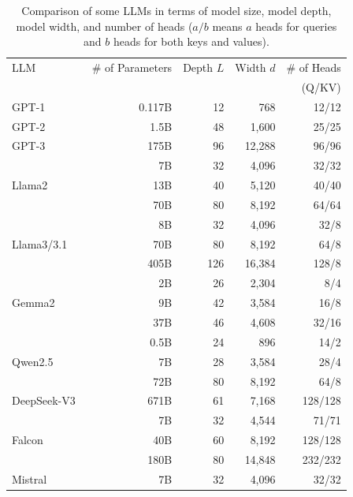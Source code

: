 \begin{table}[t]
\centering
\begingroup
\renewcommand{\arraystretch}{1.2}
\begin{tabular}{l | r | r | r | r }
LLM & \# of Parameters & Depth $L$ & Width $d$ & \# of Heads \\
    &                  &           &           &   (Q/KV)    \\ \hline
GPT-1~\cite{radford-etal:2018improving} & 0.117B & 12 & 768 & 12/12 \\
GPT-2~\cite{radford-etal:2019language} & 1.5B & 48 & 1,600 & 25/25 \\
GPT-3~\cite{brown-etal:2020language} & 175B & 96 & 12,288 & 96/96 \\ \hline
\multirow{3}{*}{Llama2~\cite{touvron-etal:2023llama2}}
                       &  7B & 32 & 4,096 & 32/32 \\
                       &  13B & 40 & 5,120 & 40/40 \\
                       &  70B & 80 & 8,192 & 64/64 \\ \hline
\multirow{3}{*}{Llama3/3.1~\cite{dubey2024llama}}
                       &  8B & 32 & 4,096 & 32/8 \\
                       &  70B & 80 & 8,192 & 64/8 \\
                       &  405B & 126 & 16,384 & 128/8 \\ \hline
\multirow{3}{*}{Gemma2~\cite{team2024gemma}}
                       &  2B & 26 & 2,304 & 8/4 \\
                       &  9B & 42 & 3,584 & 16/8 \\
                       &  37B & 46 & 4,608 & 32/16 \\ \hline
\multirow{3}{*}{Qwen2.5~\cite{yang2024qwen2}}
                       &  0.5B & 24 & 896 & 14/2 \\
                       &  7B & 28 & 3,584 & 28/4 \\
                       &  72B & 80 & 8,192 & 64/8 \\ \hline
\multirow{1}{*}{DeepSeek-V3~\cite{liu2024deepseek}}
                       &  671B & 61 & 7,168 & 128/128 \\ \hline
\multirow{3}{*}{Falcon~\cite{penedo-etal:2023refinedweb}}
                       &  7B & 32 & 4,544 & 71/71 \\
                       &  40B & 60 & 8,192 & 128/128 \\
                       &  180B & 80 & 14,848 & 232/232 \\ \hline
Mistral~\cite{jiang-etal:2023mistral} & 7B & 32 & 4,096 & 32/32
\end{tabular}
\endgroup
\caption{Comparison of some LLMs in terms of model size, model depth, model width, and number of heads ($a/b$ means $a$ heads for queries and $b$ heads for both keys and values).}
\label{tab:llm-model-size-comparison}
\end{table}


